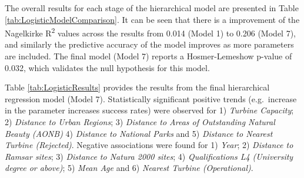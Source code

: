 \documentclass[a4paper,]{article}
\theoremstyle{definition}
\theoremstyle{definition}
\theoremstyle{definition}
\theoremstyle{remark}
\begin{document}
The overall results for each stage of the hierarchical model are presented in Table \ref{tab:LogisticModelComparison}. It can be seen that there is a improvement of the Nagelkirke R\textsuperscript{2} values across the results from 0.014 (Model 1) to 0.206 (Model 7), and similarly the predictive accuracy of the model improves as more parameters are included. The final model (Model 7) reports a Hosmer-Lemeshow p-value of 0.032, which validates the null hypothesis for this model.

\begin{table}[!h]

\caption{\label{tab:LogisticModelComparison}A summary of the hierarchical logistic regression models}
\centering
{}
\end{table}

Table \ref{tab:LogisticResults} provides the results from the final hierarchical regression model (Model 7). Statistically significant positive trends (e.g.~increase in the parameter increases success rates) were observed for 1) \emph{Turbine Capacity}; 2) \emph{Distance to Urban Regions}; 3) \emph{Distance to Areas of Outstanding Natural Beauty (AONB)} 4) \emph{Distance to National Parks} and 5) \emph{Distance to Nearest Turbine (Rejected)}. Negative associations were found for 1) \emph{Year}; 2) \emph{Distance to Ramsar sites}; 3) \emph{Distance to Natura 2000 sites}; 4) \emph{Qualifications L4 (University degree or above)}; 5) \emph{Mean Age} and 6) \emph{Nearest Turbine (Operational)}.
\end{document}
